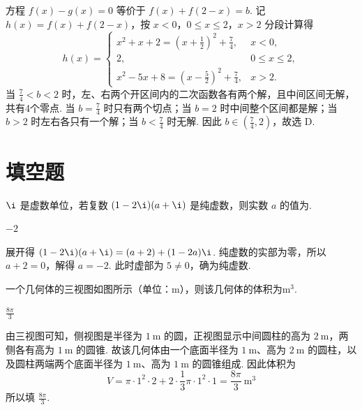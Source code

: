 \begin{solution}
方程 \(f(x)-g(x)=0\) 等价于 \(f(x)+f(2-x)=b\). 记 \(h(x)=f(x)+f(2-x)\)，按 \(x<0\)，\(0\leqslant x\leqslant2\)，\(x>2\) 分段计算得
\[
h(x)=\begin{cases}
x^2+x+2=\left(x+\frac12\right)^2+\frac74, & x<0,\\
2, & 0\leqslant x\leqslant2,\\
x^2-5x+8=\left(x-\frac52\right)^2+\frac74, & x>2.
\end{cases}
\]
当 \(\frac74<b<2\) 时，左、右两个开区间内的二次函数各有两个解，且中间区间无解，共有4个零点. 当 \(b=\frac74\) 时只有两个切点；当 \(b=2\) 时中间整个区间都是解；当 \(b>2\) 时左右各只有一个解；当 \(b<\frac74\) 时无解. 因此 \(b\in\left(\frac74,2\right)\)，故选 D.
\end{solution}

\section{填空题}

\begin{problem}
\(\i\) 是虚数单位，若复数 \((1 - 2\i)(a + \i)\) 是纯虚数，则实数 \(a\) 的值为\fillinblank{}.
\end{problem}

\begin{answer}
\(-2\)
\end{answer}

\begin{solution}
展开得 \((1-2\i)(a+\i)=(a+2)+(1-2a)\i\). 纯虚数的实部为零，所以 \(a+2=0\)，解得 \(a=-2\). 此时虚部为 \(5\ne0\)，确为纯虚数.
\end{solution}

\begin{problem}
一个几何体的三视图如图所示（单位：\(\mathrm{m}\)），则该几何体的体积为\fillinblank{}\(\mathrm{m}^3\).
\end{problem}

\begin{answer}
\(\frac{8\pi}{3}\)
\end{answer}

\begin{solution}
由三视图可知，侧视图是半径为 \(1\mathrm{~m}\) 的圆，正视图显示中间圆柱的高为 \(2\mathrm{~m}\)，两侧各有高为 \(1\mathrm{~m}\) 的圆锥. 故该几何体由一个底面半径为 \(1\mathrm{~m}\)、高为 \(2\mathrm{~m}\) 的圆柱，以及圆柱两端两个底面半径为 \(1\mathrm{~m}\)、高为 \(1\mathrm{~m}\) 的圆锥组成. 因此体积为
\[
V=\pi\cdot1^2\cdot2+2\cdot\frac13\pi\cdot1^2\cdot1=\frac{8\pi}{3}\mathrm{~m}^3
\]
所以填 \(\frac{8\pi}{3}\).
\end{solution}

